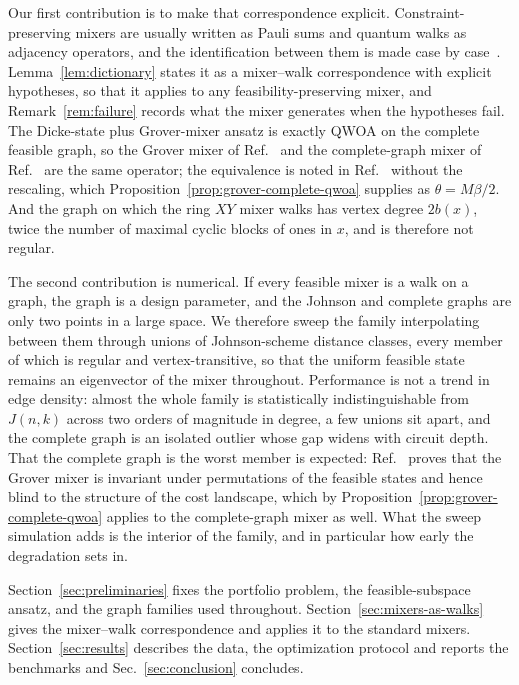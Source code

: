 Our first contribution is to make that correspondence explicit.  Constraint-preserving mixers are usually written as Pauli sums and quantum walks as adjacency operators, and the identification between them is made case by case~\cite{Marsh2019, Marsh2020, Slate2021, Bartschi2020, Fuchs2022, Matwiejew2024}. Lemma~\ref{lem:dictionary} states it as a mixer--walk correspondence with explicit hypotheses, so that it applies to any feasibility-preserving mixer, and Remark~\ref{rem:failure} records what the mixer generates when the hypotheses fail. The Dicke-state plus Grover-mixer ansatz is exactly QWOA on the complete feasible graph, so the Grover mixer of Ref.~\cite{Bartschi2020} and the complete-graph mixer of Ref.~\cite{Slate2021} are the same operator; the equivalence is noted in Ref.~\cite{Bridi2024} without the rescaling, which Proposition~\ref{prop:grover-complete-qwoa} supplies as $\theta=M\beta/2$. And the graph on which the ring $XY$ mixer walks has vertex degree $2b(x)$, twice the number of maximal cyclic blocks of ones in $x$, and is therefore not regular.

The second contribution is numerical. If every feasible mixer is a walk on a graph, the graph is a design parameter, and the Johnson and complete graphs are only two points in a large space. We therefore sweep the family interpolating between them through unions of Johnson-scheme distance classes, every member of which is regular and vertex-transitive, so that the uniform feasible state remains an eigenvector of the mixer throughout. Performance is not a trend in edge density: almost the whole family is statistically indistinguishable from $J(n,k)$ across two orders of magnitude in degree, a few unions sit apart, and the complete graph is an isolated outlier whose gap widens with circuit depth. That the complete graph is the worst member is expected: Ref.~\cite{Bridi2024} proves that the Grover mixer is invariant under permutations of the feasible states and hence blind to the structure of the cost landscape, which by Proposition~\ref{prop:grover-complete-qwoa} applies to the complete-graph mixer as well. What the sweep simulation adds is the interior of the family, and in particular how early the degradation sets in.

Section~\ref{sec:preliminaries} fixes the portfolio problem, the feasible-subspace ansatz, and the graph families used throughout. Section~\ref{sec:mixers-as-walks} gives the mixer--walk correspondence and applies it to the standard mixers. Section~\ref{sec:results} describes the data, the optimization protocol and reports the benchmarks and Sec.~\ref{sec:conclusion} concludes.